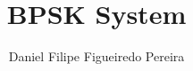 \documentclass[a4paper]{article}
\title{BPSK System}
\author{Daniel Filipe Figueiredo Pereira}
\begin{document}
\maketitle



\pagebreak



\pagebreak



\pagebreak



\pagebreak



\pagebreak



\pagebreak



\pagebreak



\pagebreak


\end{document}

